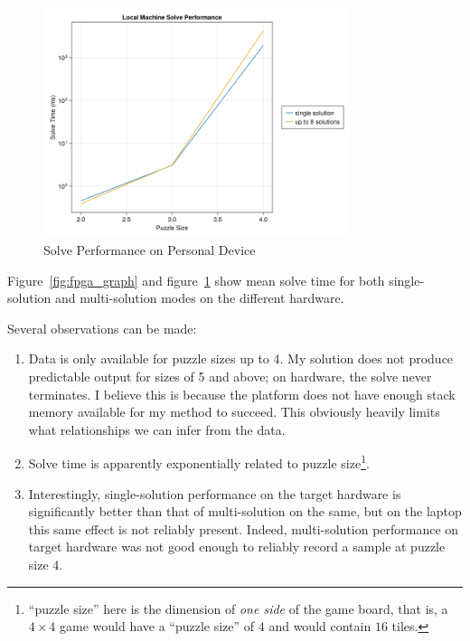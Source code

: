 \documentclass[11pt]{article}
\begin{document}
\begin{figure}[h]
  \centering
  \includegraphics[width=0.8\textwidth]{host_perf}
  \caption{Solve Performance on Personal Device}
  \label{fig:laptop_graph}
\end{figure}


Figure~\ref{fig:fpga_graph} and figure~\ref{fig:laptop_graph} show mean solve time for both single-solution and multi-solution modes on the different hardware.

Several observations can be made:

\begin{enumerate}
  \item Data is only available for puzzle sizes up to 4.
    My solution does not produce predictable output for sizes of 5 and above; on hardware, the solve never terminates.
    I believe this is because the platform does not have enough stack memory available for my method to succeed.
    This obviously heavily limits what relationships we can infer from the data.
  \item Solve time is apparently exponentially related to puzzle size\footnote{``puzzle size'' here is the dimension of \textit{one side} of the game board, that is, a $4 \times 4$ game would have a ``puzzle size'' of $4$ and would contain $16$ tiles.}.
  \item Interestingly, single-solution performance on the target hardware is significantly better than that of multi-solution on the same, but on the laptop this same effect is not reliably present.
    Indeed, multi-solution performance on target hardware was not good enough to reliably record a sample at puzzle size 4.
\end{enumerate}

\end{document}
